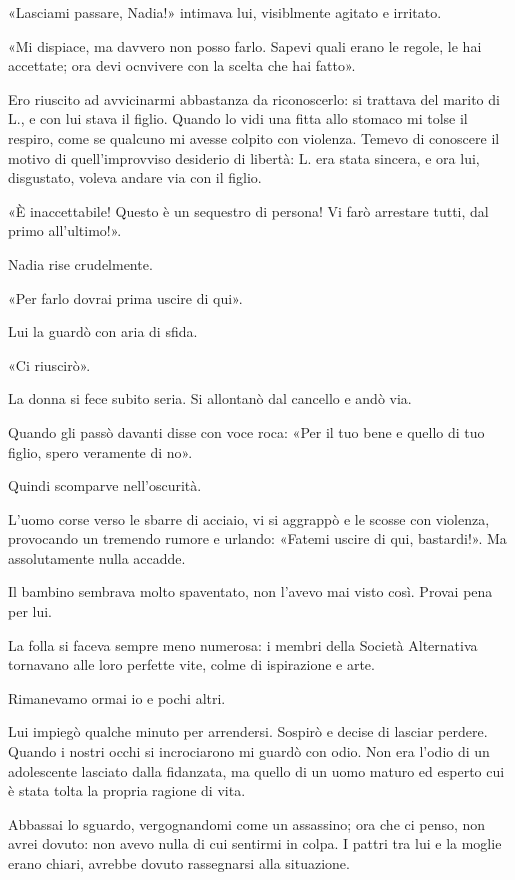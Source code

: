 \documentclass[a4paper,12pt]{book}
\begin{document}
«Lasciami passare, Nadia!» intimava lui, visiblmente agitato e irritato.

«Mi dispiace, ma davvero non posso farlo. Sapevi quali erano le regole, le hai
accettate; ora devi ocnvivere con la scelta che hai fatto».

Ero riuscito ad avvicinarmi abbastanza da riconoscerlo: si trattava del marito
di L., e con lui stava il figlio. Quando lo vidi una fitta allo stomaco mi
tolse il respiro, come se qualcuno mi avesse colpito con violenza. Temevo di
conoscere il motivo di quell'improvviso desiderio di libertà: L. era stata
sincera, e ora lui, disgustato, voleva andare via con il figlio.

«È inaccettabile! Questo è un sequestro di persona! Vi farò arrestare tutti, dal
primo all'ultimo!».

Nadia rise crudelmente.

«Per farlo dovrai prima uscire di qui».

Lui la guardò con aria di sfida.

«Ci riuscirò».

La donna si fece subito seria. Si allontanò dal cancello e andò via.

Quando gli passò davanti disse con voce roca: «Per il tuo bene e quello di tuo
figlio, spero veramente di no».

Quindi scomparve nell'oscurità.

L'uomo corse verso le sbarre di acciaio, vi si aggrappò e le scosse con
violenza, provocando un tremendo rumore e urlando: «Fatemi uscire di qui,
bastardi!». Ma assolutamente nulla accadde.

Il bambino sembrava molto spaventato, non l'avevo mai visto così. Provai pena
per lui.

La folla si faceva sempre meno numerosa: i membri della Società Alternativa
tornavano alle loro perfette vite, colme di ispirazione e arte.

Rimanevamo ormai io e pochi altri.

Lui impiegò qualche minuto per arrendersi. Sospirò e decise di lasciar perdere.
Quando i nostri occhi si incrociarono mi guardò con odio. Non era l'odio di un
adolescente lasciato dalla fidanzata, ma quello di un uomo maturo ed esperto cui
è stata tolta la propria ragione di vita.

Abbassai lo sguardo, vergognandomi come un assassino; ora che ci penso, non
avrei dovuto: non avevo nulla di cui sentirmi in colpa. I pattri tra lui e la
moglie erano chiari, avrebbe dovuto rassegnarsi alla situazione.
\end{document}

